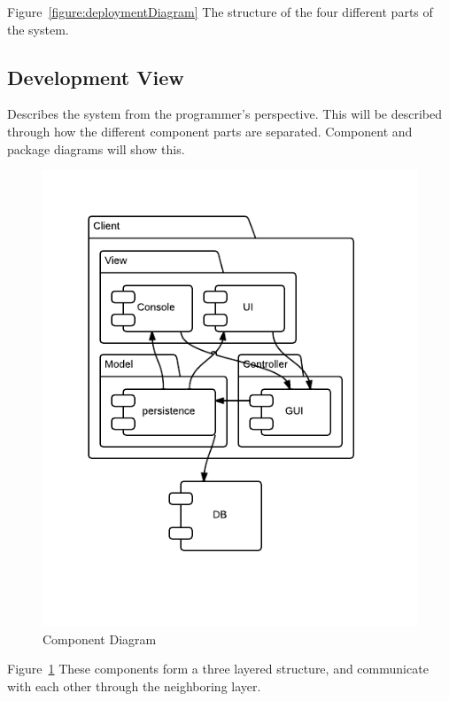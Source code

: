 Figure~\ref{figure:deploymentDiagram} The structure of the four different parts of the system.


\subsection{Development View}
Describes the system from the programmer's perspective. This will be described through how the different component parts are separated. Component and package diagrams will show this.

\begin{figure}[h]
\centering
\includegraphics[width=5in]{image/ComponentDiagram.png}
\caption{Component Diagram}
\label{figure:componentDiagram}
\end{figure}

Figure~\ref{figure:componentDiagram} These components form a three layered structure, and communicate with each other through the neighboring layer.




